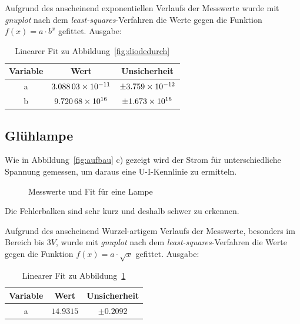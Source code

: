 Aufgrund des anscheinend exponentiellen Verlaufs der Messwerte wurde mit \emph{gnuplot} nach dem \emph{least-squares}-Verfahren die Werte gegen die Funktion $f(x)=a\cdot b^x$ gefittet. Ausgabe:
\begin{table}[H]
  \centering
  \begin{tabular}{c | c | c }
    Variable & Wert & Unsicherheit\\ \hline
    a & $\num{3.08803d-11}$ & $\pm\num{3.759d-12}$ \\
    b & $\num{9,72068d16}$ & $\pm\num{1.673d16}$
  \end{tabular}
  \caption{Linearer Fit zu Abbildung~\ref{fig:diodedurch}}
  \label{tab:fitdiodedurch}
\end{table}
\subsection{Glühlampe}
Wie in Abbildung~\ref{fig:aufbau} c) gezeigt wird der Strom für unterschiedliche Spannung gemessen, um daraus eine U-I-Kennlinie zu ermitteln.

\begin{figure}[H]
\centering
{}
\caption{Messwerte und Fit für eine Lampe}
\label{fig:Lampe}
\end{figure}
Die Fehlerbalken sind sehr kurz und deshalb schwer zu erkennen.

Aufgrund des anscheinend Wurzel-artigem Verlaufs der Messwerte, besonders im Bereich bis $3V$, wurde mit \emph{gnuplot} nach dem \emph{least-squares}-Verfahren die Werte gegen die Funktion $f(x)=a\cdot\sqrt{x}$ gefittet. Ausgabe:
\begin{table}[H]
  \centering
  \begin{tabular}{c | c | c }
    Variable & Wert & Unsicherheit\\ \hline
    a & $\num{14,9315}$ & $\pm\num{0,2092}$ \\
   
  \end{tabular}
  \caption{Linearer Fit zu Abbildung~\ref{fig:Lampe}}
  \label{tab:fitlampe}
\end{table}
